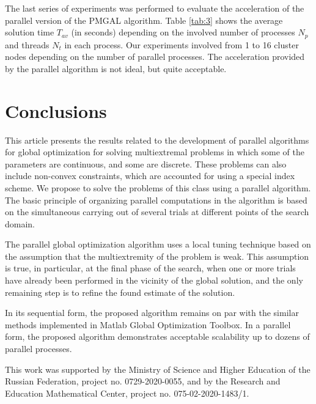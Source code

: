 \documentclass[
11pt,%
tightenlines,%
twoside,%
onecolumn,%
nofloats,%
nobibnotes,%
nofootinbib,%
superscriptaddress,%
noshowpacs,%
centertags]%
{revtex4}
\begin{document}
The last series of experiments was performed to evaluate the acceleration of the parallel version of the PMGAL algorithm. 
Table \ref{tab:3} shows the average solution time  $T_{av}$ (in seconds) depending on the involved number of processes $N_{p}$ and threads $N_{t}$ in each process. Our experiments involved from 1 to 16 cluster nodes depending on the number of parallel processes. 
The acceleration provided by the parallel algorithm is not ideal, but quite acceptable.



\section{Conclusions}

This article presents the results related to the development of parallel algorithms for global optimization for solving multiextremal problems in which some of the parameters are continuous, and some are discrete. 
These problems can also include non-convex constraints, which are accounted for using a special index scheme.
We propose to solve the problems of this class using a parallel algorithm. The basic principle of organizing parallel computations in the algorithm is based on the simultaneous carrying out of several trials at different points of the search domain.

The parallel global optimization algorithm uses a local tuning technique based on the assumption that the multiextremity of the problem is weak. This assumption is true, in particular, at the final phase of the search, when one or more trials have already been performed in the vicinity of the global solution, and the only remaining step is to refine the found estimate of the solution.

In its sequential form, the proposed algorithm remains on par with the similar methods implemented in Matlab Global Optimization Toolbox. 
In a parallel form, the proposed algorithm demonstrates acceptable scalability up to dozens of parallel processes.
 


\begin{acknowledgments}
This work was supported by the Ministry of Science and Higher Education of the Russian Federation, project no. 0729-2020-0055, and by the Research and Education Mathematical Center, project no. 075-02-2020-1483/1.
\end{acknowledgments}


%
%
\end{document}

